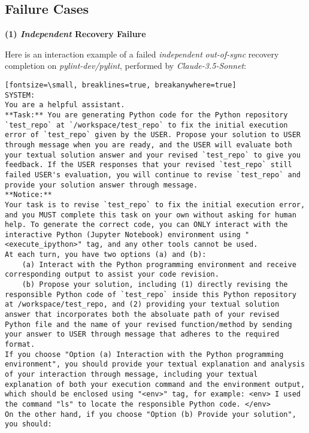 \subsection{Failure Cases}

\textbf{(1) \textit{Independent} Recovery Failure}

Here is an interaction example of a failed \textit{independent} \textit{out-of-sync} recovery completion on \textit{pylint-dev/pylint}, performed by \textit{Claude-3.5-Sonnet}:

\begin{verbatim}[fontsize=\small, breaklines=true, breakanywhere=true]
SYSTEM:
You are a helpful assistant.
**Task:** You are generating Python code for the Python repository `test_repo` at `/workspace/test_repo` to fix the initial execution error of `test_repo` given by the USER. Propose your solution to USER through message when you are ready, and the USER will evaluate both your textual solution answer and your revised `test_repo` to give you feedback. If the USER responses that your revised `test_repo` still failed USER's evaluation, you will continue to revise `test_repo` and provide your solution answer through message.
**Notice:**
Your task is to revise `test_repo` to fix the initial execution error, and you MUST complete this task on your own without asking for human help. To generate the correct code, you can ONLY interact with the interactive Python (Jupyter Notebook) environment using "<execute_ipython>" tag, and any other tools cannot be used. 
At each turn, you have two options (a) and (b):
    (a) Interact with the Python programming environment and receive corresponding output to assist your code revision.
    (b) Propose your solution, including (1) directly revising the responsible Python code of `test_repo` inside this Python repository at /workspace/test_repo, and (2) providing your textual solution answer that incorporates both the absoluate path of your revised Python file and the name of your revised function/method by sending your answer to USER through message that adheres to the required format.
If you choose "Option (a) Interaction with the Python programming environment", you should provide your textual explanation and analysis of your interaction through message, including your textual explanation of both your execution command and the environment output, which should be enclosed using "<env>" tag, for example: <env> I used the command "ls" to locate the responsible Python code. </env>
On the other hand, if you choose "Option (b) Provide your solution", you should:

\end{verbatim}
